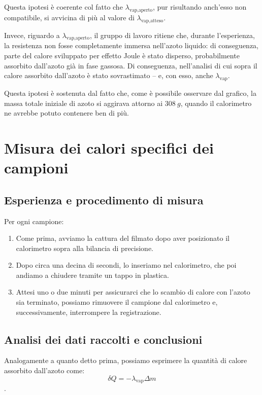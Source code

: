 \documentclass{article}
\begin{document}
Questa ipotesi è coerente col fatto che $\lambda_\text{vap,aperto}$,
pur risultando anch'esso non compatibile, si avvicina di più al valore
di $\lambda_\text{vap,atteso}$.

\vspace{2mm}
Invece, riguardo a $\lambda_\text{vap,aperto}$, il gruppo di
lavoro ritiene che, durante l'esperienza, la resistenza non fosse
completamente immersa nell'azoto liquido: di conseguenza, parte
del calore sviluppato per effetto Joule è stato disperso,
probabilmente assorbito dall'azoto già in fase gassosa.
Di conseguenza, nell'analisi di cui sopra il calore assorbito
dall'azoto è stato sovrastimato – e, con esso, anche
$\lambda_\text{vap}$.

Questa ipotesi è sostenuta dal fatto che, come è possibile
osservare dal grafico, la massa totale iniziale di azoto si
aggirava attorno ai $\qty{308}{g}$, quando il calorimetro ne
avrebbe potuto contenere ben di più.

\section{Misura dei calori specifici dei campioni}

\subsection{Esperienza e procedimento di misura}

Per ogni campione:
\begin{enumerate}
  \item
    Come prima, avviamo la cattura del filmato dopo aver posizionato il calorimetro
    sopra alla bilancia di precisione.
  \item
    Dopo circa una decina di secondi, lo inseriamo nel calorimetro, che poi andiamo
    a chiudere tramite un tappo in plastica.
  \item
    Attesi uno o due minuti per assicurarci che lo scambio di calore con l'azoto
    sia terminato, possiamo rimuovere il campione dal calorimetro e, successivamente,
    interrompere la registrazione.

\end{enumerate}

\subsection{Analisi dei dati raccolti e conclusioni}
  Analogamente a quanto detto prima, possiamo esprimere la quantità di calore
  assorbito dall'azoto come: \[\delta Q = - \lambda_\text{vap} \Delta m\].
\end{document}
